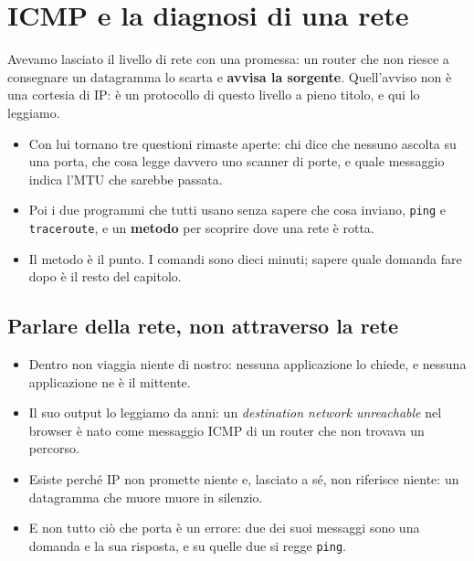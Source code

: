 \chapter{ICMP e la diagnosi di una rete}

Avevamo lasciato il livello di rete con una promessa: un router che non riesce a consegnare un datagramma lo scarta e
\textbf{avvisa la sorgente}. Quell'avviso non è una cortesia di IP: è un protocollo di questo livello a pieno titolo, e
qui lo leggiamo.
\begin{itemize}
    \item Con lui tornano tre questioni rimaste aperte: chi dice che nessuno ascolta su una porta, che cosa legge davvero uno
          scanner di porte, e quale messaggio indica l'MTU che sarebbe passata.
    \item Poi i due programmi che tutti usano senza sapere che cosa inviano, \texttt{ping} e \texttt{traceroute}, e un
          \textbf{metodo} per scoprire dove una rete è rotta.
    \item Il metodo è il punto. I comandi sono dieci minuti; sapere quale domanda fare dopo è il resto del capitolo.
\end{itemize}

\section{Parlare della rete, non attraverso la rete}


\begin{itemize}
    \item Dentro non viaggia niente di nostro: nessuna applicazione lo chiede, e nessuna applicazione ne è il mittente.
    \item Il suo output lo leggiamo da anni: un \emph{destination network unreachable} nel browser è nato come messaggio ICMP
          di un router che non trovava un percorso.
    \item Esiste perché IP non promette niente e, lasciato a sé, non riferisce niente: un datagramma che muore muore in
          silenzio.
    \item E non tutto ciò che porta è un errore: due dei suoi messaggi sono una domanda e la sua risposta, e su quelle due si
          regge \texttt{ping}.
\end{itemize}

